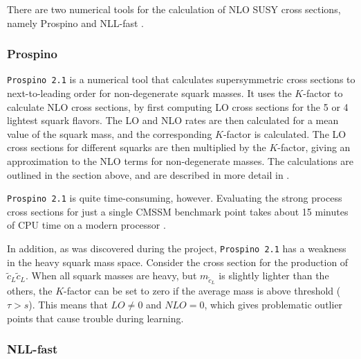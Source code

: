 \documentclass[twoside,english]{uiofysmaster}
\begin{document}
{There are two numerical tools for the calculation of NLO SUSY cross sections, namely Prospino \cite{beenakker1996prospino} and NLL-fast \cite{beenakker2016nlo+}.

\subsubsection{Prospino}\label{Sec:: susy hadron : Prospino}
\verb|Prospino 2.1| \cite{beenakker1996prospino} is a numerical tool that calculates supersymmetric cross sections to next-to-leading order for non-degenerate squark masses. It uses the $K$-factor to calculate NLO cross sections, by first computing LO cross sections for the 5 or 4 lightest squark flavors. The LO and NLO rates are then calculated for a mean value of the squark mass, and the corresponding $K$-factor is calculated. The LO cross sections for different squarks are then multiplied by the $K$-factor, giving an approximation to the NLO terms for non-degenerate masses. The calculations are outlined in the section above, and are described in more detail in \cite{beenakker1996prospino}. 

\verb|Prospino 2.1| is quite time-consuming, however. Evaluating the strong process cross sections for just a single CMSSM benchmark point takes about 15 minutes of CPU time on a modern processor \cite{balazs2017colliderbit}. 

In addition, as was discovered during the project, \verb|Prospino 2.1| has a weakness in the heavy squark mass space. Consider the cross section for the production of $\widetilde{c}_L \widetilde{c}_L$. When all squark masses are heavy, but $m_{\widetilde{c}_L}$ is slightly lighter than the others, the $K$-factor can be set to zero if the average mass is above threshold ($\tau > s$). This means that $LO \neq 0$ and $NLO =0$, which gives problematic outlier points that cause trouble during learning.



\subsubsection{NLL-fast}

}
\end{document}
